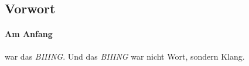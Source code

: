 \subsection{Vorwort}

\paragraph{Am Anfang} war das \emph{BIIING}.
Und das \emph{BIIING} war nicht Wort, sondern Klang.

